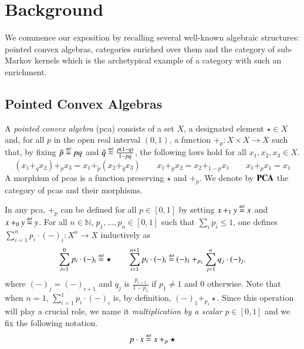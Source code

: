 
\section{Background}\label{sec:pca} 
We commence our exposition by recalling several well-known algebraic structures: pointed convex algebras, categories enriched over them and the category of sub-Markov kernels which is the archetypical example of a category with such an enrichment.

\subsection{Pointed Convex Algebras}\label{ssec:pca} A \emph{pointed convex algebra} (pca) \cite{stone1949postulates} consists of a set $X$, a designated element $\star \in X$ and, for all $p$ in the open real interval $(0,1)$, a function $+_p \colon X\times X \to X$ such that, by fixing $\tilde{p}\stackrel{\text{\tiny def}}{=} pq$ and $\tilde{q}\stackrel{\text{\tiny def}}{=} \frac{p(1-q)}{1-pq}$, the following laws hold for all $x_1,x_2,x_3\in X$. %
\begin{equation}\label{eq:pca}(x_1+_q x_2)+_p x_3 =  x_1 +_{\tilde{p}} (x_2+_{\tilde{q}} x_3) \qquad x_1+_px_2=x_2+_{1-p}x_1 \qquad  x_1+_p x_1 = x_1\end{equation}
A morphism of pcas is a function preserving $\star$ and $+_p$. %
We denote by $\mathbf{PCA}$ the category of pcas and their morphisms.  

In any pca, $+_p$ can be defined for all $p\in[0,1]$ by setting $x+_1 y \stackrel{\text{\tiny def}}{=} x$ and $x+_0 y \stackrel{\text{\tiny def}}{=} y$. For all $n\in \mathbb{N}$, $p_1, \dots, p_n \in [0,1]$ such that $\sum_i p_i\leq 1$, one defines $\sum_{i=1}^n p_i\cdot (-)_i \colon X^n \to X$ inductively as
%
\begin{equation}\label{eq:def somma n pca}
    \sum_{i=1}^0 p_i\cdot (-)_i \stackrel{\text{\tiny def}}{=} \star \qquad \sum_{i=1}^{n+1} p_i\cdot (-)_i \stackrel{\text{\tiny def}}{=} (-)_{1} +_{p_{1}} \sum_{j=1}^n q_j \cdot (-)_j\text{.}
\end{equation}
where $(-)_j=(-)_{i+1}$ and $q_j$ is $\frac{p_{i+1}}{1-p_1}$ if $p_1 \neq 1$ and $0$ otherwise.
Note that when $n=1$, $\sum_{i=1}^1p_i \cdot (-)_i$ is, by definition, $(-)_1 +_{p_1} \star$. Since this operation will play a crucial role, we name it \emph{multiplication by a scalar} $p\in [0,1]$ and we fix the following notation. \[p\cdot x \stackrel{\text{\tiny def}}{=} x+_p \star\] 

